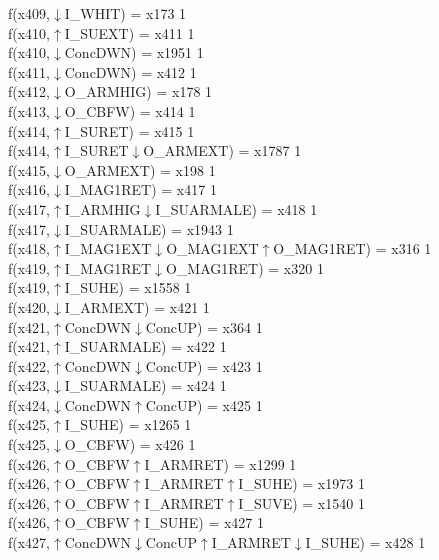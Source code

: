 f(x409,$\downarrow$I\_WHIT) = x173 {1} \\
f(x410,$\uparrow$I\_SUEXT) = x411 {1} \\
f(x410,$\downarrow$ConcDWN) = x1951 {1} \\
f(x411,$\downarrow$ConcDWN) = x412 {1} \\
f(x412,$\downarrow$O\_ARMHIG) = x178 {1} \\
f(x413,$\downarrow$O\_CBFW) = x414 {1} \\
f(x414,$\uparrow$I\_SURET) = x415 {1} \\
f(x414,$\uparrow$I\_SURET$\downarrow$O\_ARMEXT) = x1787 {1} \\
f(x415,$\downarrow$O\_ARMEXT) = x198 {1} \\
f(x416,$\downarrow$I\_MAG1RET) = x417 {1} \\
f(x417,$\uparrow$I\_ARMHIG$\downarrow$I\_SUARMALE) = x418 {1} \\
f(x417,$\downarrow$I\_SUARMALE) = x1943 {1} \\
f(x418,$\uparrow$I\_MAG1EXT$\downarrow$O\_MAG1EXT$\uparrow$O\_MAG1RET) = x316 {1} \\
f(x419,$\uparrow$I\_MAG1RET$\downarrow$O\_MAG1RET) = x320 {1} \\
f(x419,$\uparrow$I\_SUHE) = x1558 {1} \\
f(x420,$\downarrow$I\_ARMEXT) = x421 {1} \\
f(x421,$\uparrow$ConcDWN$\downarrow$ConcUP) = x364 {1} \\
f(x421,$\uparrow$I\_SUARMALE) = x422 {1} \\
f(x422,$\uparrow$ConcDWN$\downarrow$ConcUP) = x423 {1} \\
f(x423,$\downarrow$I\_SUARMALE) = x424 {1} \\
f(x424,$\downarrow$ConcDWN$\uparrow$ConcUP) = x425 {1} \\
f(x425,$\uparrow$I\_SUHE) = x1265 {1} \\
f(x425,$\downarrow$O\_CBFW) = x426 {1} \\
f(x426,$\uparrow$O\_CBFW$\uparrow$I\_ARMRET) = x1299 {1} \\
f(x426,$\uparrow$O\_CBFW$\uparrow$I\_ARMRET$\uparrow$I\_SUHE) = x1973 {1} \\
f(x426,$\uparrow$O\_CBFW$\uparrow$I\_ARMRET$\uparrow$I\_SUVE) = x1540 {1} \\
f(x426,$\uparrow$O\_CBFW$\uparrow$I\_SUHE) = x427 {1} \\
f(x427,$\uparrow$ConcDWN$\downarrow$ConcUP$\uparrow$I\_ARMRET$\downarrow$I\_SUHE) = x428 {1} \\
